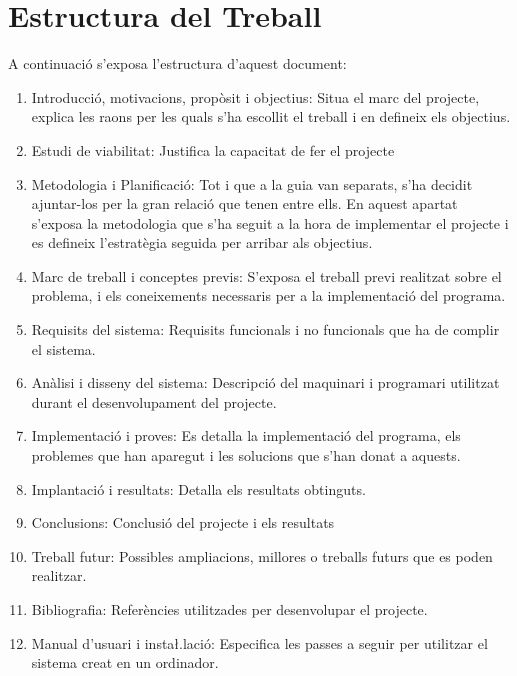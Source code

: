 \documentclass[11pt,a4paper,twoside]{report}
\begin{document}
  \section{Estructura del Treball}
  A continuació s'exposa l'estructura d'aquest document: 
  \begin{enumerate}
    \item Introducció, motivacions, propòsit i objectius: Situa el marc del projecte, explica les raons per les quals s'ha escollit el treball i en defineix els objectius.
    \item Estudi de viabilitat: Justifica la capacitat de fer el projecte
    \item Metodologia i Planificació: Tot i que a la guia van separats, s'ha decidit ajuntar-los per la gran relació que tenen entre ells. En aquest apartat s'exposa la metodologia que s'ha seguit a la hora de implementar el projecte i es defineix l'estratègia seguida per arribar als objectius.
    \item Marc de treball i conceptes previs: S'exposa el treball previ realitzat sobre el problema, i els coneixements necessaris per a la implementació del programa.
    \item Requisits del sistema: Requisits funcionals i no funcionals que ha de complir el sistema.
    \item Anàlisi i disseny del sistema: Descripció del maquinari i programari utilitzat durant el desenvolupament del projecte.
    \item Implementació i proves: Es detalla la implementació del programa, els problemes que han aparegut i les solucions que s'han donat a aquests.
    \item Implantació i resultats: Detalla els resultats obtinguts.
    \item Conclusions: Conclusió del projecte i els resultats
    \item Treball futur: Possibles ampliacions, millores o treballs futurs que es poden realitzar.
    \item Bibliografia: Referències utilitzades per desenvolupar el projecte.
    \item Manual d'usuari i insta\l.lació: Especifica les passes a seguir per utilitzar el sistema creat en un ordinador.

  \end{enumerate}
\end{document}
